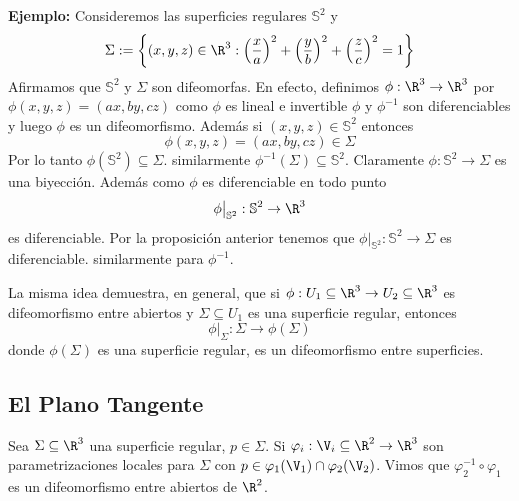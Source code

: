\documentclass{article}
\begin{document}
\noindent\textbf{Ejemplo:} Consideremos las superficies regulares $\mathbb{S}^{2}$ y
\begin{equation*}
    \Sigma:=\left\{(x,y,z)\in\R^{3}:
    \left(\frac{x}{a}\right)^{2}+\left(\frac{y}{b}\right)^{2}+\left(\frac{z}{c}\right)^{2}=1
    \right\}
\end{equation*}
Afirmamos que $\mathbb{S}^{2}$ y $\Sigma$ son difeomorfas. En efecto, definimos 
$\phi:\R^{3}\to\R^{3}$ por $\phi(x,y,z)=(ax,by,cz)$ como $\phi$ es lineal e invertible $\phi$ y 
$\phi^{-1}$ son diferenciables y luego $\phi$ es un difeomorfismo. Además si 
$(x,y,z)\in\mathbb{S}^{2}$ entonces
\begin{equation*}
    \phi(x,y,z)=(ax,by,cz)\in\Sigma
\end{equation*}
Por lo tanto $\phi(\mathbb{S}^{2})\subseteq\Sigma$. similarmente $\phi^{-1}(\Sigma)\subseteq
\mathbb{S}^{2}$. Claramente $\phi:\mathbb{S}^{2}\to\Sigma$ es una biyección. Además como $\phi$ 
es diferenciable en todo punto
\begin{equation*}
    \phi\big|_{\mathbb{S}^{2}}:\mathbb{S}^{2}\to\R^{3}
\end{equation*}
es diferenciable. Por la proposición anterior tenemos que $\phi\big|_{\mathbb{S}^{2}}:
\mathbb{S}^{2}\to\Sigma$ es diferenciable. similarmente para $\phi^{-1}$.
\vspace{4mm}

\noindent La misma idea demuestra, en general, que si $\phi:U_{1}\subseteq\R^{3}
\to U_{2}\subseteq\R^{3}$ es difeomorfismo entre abiertos y $\Sigma\subseteq U_{1}$ es una 
superficie regular, entonces
\begin{equation*}
    \phi\big|_{\Sigma}:\Sigma\to\phi(\Sigma)
\end{equation*}
donde $\phi(\Sigma)$ es una superficie regular, es un difeomorfismo entre superficies.

\subsection{El Plano Tangente}
Sea $\Sigma\subseteq\R^{3}$ una superficie regular, $p\in\Sigma$. Si $\varphi_{i}:\V_{i}\subseteq
\R^{2}\to\R^{3}$ son parametrizaciones locales para $\Sigma$ con $p\in\varphi_{1}(\V_{1})\cap
\varphi_{2}(\V_{2})$. Vimos que $\varphi_{2}^{-1}\circ\varphi_{1}$ es un difeomorfismo entre 
abiertos de $\R^{2}$.
\vspace{4mm}
\end{document}
